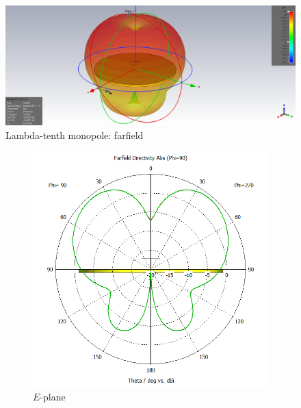 \documentclass[11pt,a4paper]{article}
\begin{document}
\newpage
        \begin{figure}[!ht]
            \centering
            \includegraphics[width=.8\textwidth]{src/lambda-tenth-farfield.png}
            \caption{\label{fig:lambda-tenth-farfield}Lambda-tenth monopole: farfield}
        \end{figure}

        \begin{figure}[!ht]
            \centering
            \begin{subfigure}{.4\textwidth}
                \centering
                \includegraphics[width=\textwidth]{src/lambda-tenth-radiation-e.png}
                \caption{\label{fig:lambda-tenth-radiation-e}$E$-plane}
            \end{subfigure}
            ~
            \begin{subfigure}{.4\textwidth}
                \centering

\end{subfigure}
\end{figure}
\end{document}

